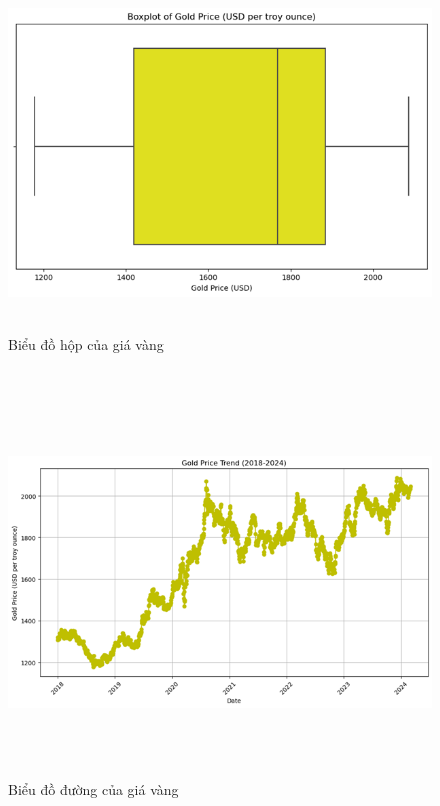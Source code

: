 \documentclass[conference]{IEEEtran}
\begin{document}
\begin{figure}[H]
    \centering
    \begin{minipage}{0.23\textwidth}
    \centering
    \includegraphics[width=1\textwidth]{bibliography/Figure/boxplot_gold.png}
    \caption{Biểu đồ hộp của giá vàng}
    \label{fig:1}
    \end{minipage}
    \hfill
    \begin{minipage}{0.23\textwidth}
    \centering
    \includegraphics[width=1\textwidth]{bibliography/Figure/line_gold.png}
    \caption{Biểu đồ đường của giá vàng}
    \label{fig:2}
    \end{minipage}
\end{figure} 
\end{document}
